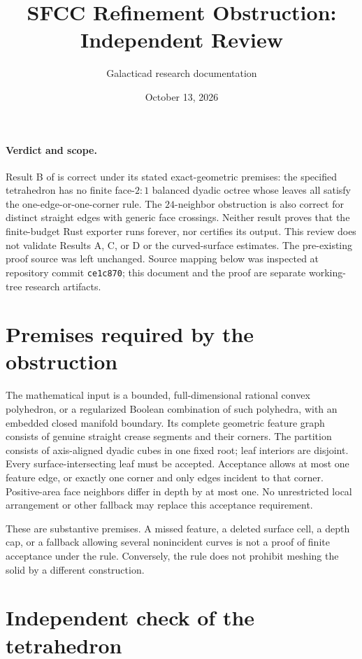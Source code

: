 \documentclass[11pt]{article}
\title{SFCC Refinement Obstruction: Independent Review}
\author{Galacticad research documentation}
\date{October 13, 2026}
\begin{document}
\maketitle

\paragraph{Verdict and scope.}
Result B of  is correct
under its stated exact-geometric premises: the specified tetrahedron has
no finite face-$2{:}1$ balanced dyadic octree whose leaves all satisfy the
one-edge-or-one-corner rule. The $24$-neighbor obstruction is also correct
for distinct straight edges with generic face crossings. Neither result
proves that the finite-budget Rust exporter runs forever, nor certifies
its output. This review does not validate Results A, C, or D or the
curved-surface estimates. The pre-existing proof source was left unchanged.
Source mapping below was inspected at repository commit
\texttt{ce1c870}; this document and the proof are separate working-tree
research artifacts.

\section{Premises required by the obstruction}

The mathematical input is a bounded, full-dimensional rational convex
polyhedron, or a regularized Boolean combination of such polyhedra, with
an embedded closed manifold boundary. Its complete geometric feature
graph consists of genuine straight crease segments and their corners.
The partition consists of axis-aligned dyadic cubes in one fixed root;
leaf interiors are disjoint. Every surface-intersecting leaf must be
accepted. Acceptance allows at most one feature edge, or exactly one
corner and only edges incident to that corner. Positive-area face
neighbors differ in depth by at most one. No unrestricted local
arrangement or other fallback may replace this acceptance requirement.

These are substantive premises. A missed feature, a deleted surface
cell, a depth cap, or a fallback allowing several nonincident curves is
not a proof of finite acceptance under the rule. Conversely, the rule
does not prohibit meshing the solid by a different construction.

\section{Independent check of the tetrahedron}
\end{document}
